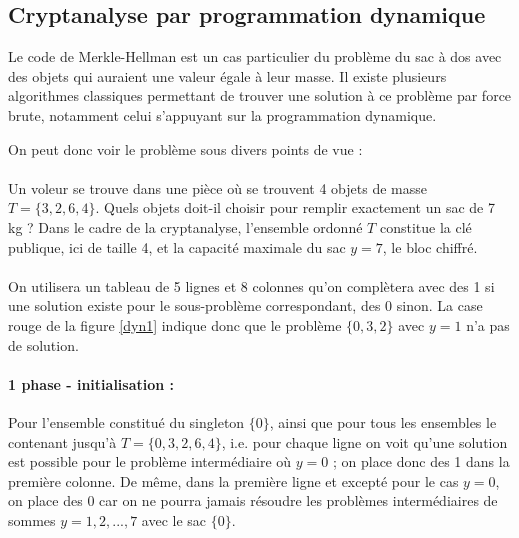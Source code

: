 \subsection{Cryptanalyse par programmation dynamique}
\label{dyn}

Le code de Merkle-Hellman est un cas particulier du problème du sac à dos avec des objets qui auraient une valeur égale à leur masse. Il existe plusieurs algorithmes classiques permettant de trouver une solution à ce problème par force brute, notamment celui s'appuyant sur la programmation dynamique.

On peut donc voir le problème sous divers points de vue : 

\paragraph{} Un voleur se trouve dans une pièce où se trouvent 4 objets de masse $T = \{3, 2, 6, 4\}$. 
Quels objets doit-il choisir pour remplir exactement un sac de 7 kg ?
Dans le cadre de la cryptanalyse, l'ensemble ordonné $T$ constitue la clé 
publique, ici de taille 4, et la capacité maximale du sac $y = 7$, le bloc chiffré.

\paragraph{} On utilisera un tableau de 5 lignes et 8 colonnes qu'on complètera avec des 1 si une solution existe pour le sous-problème correspondant, des 0 sinon. La case rouge de la figure \ref{dyn1} indique donc que le problème
$\{0,3,2\}$ avec $y = 1$ n'a pas de solution.

\paragraph{1\iere{} phase - initialisation :} Pour l'ensemble constitué du singleton $\{0\}$, 
ainsi que pour tous les ensembles le contenant jusqu'à $T = \{0, 3, 2, 6, 4\}$, i.e. pour chaque ligne
on voit qu'une solution est possible pour le problème intermédiaire où $y = 0$ ;
on place donc des 1 dans la première colonne. De même, dans la première ligne et excepté pour le cas $y = 0$, on place des 0 car on ne pourra jamais résoudre les problèmes intermédiaires de sommes $y = 1, 2, ..., 7$ avec le sac $\{0\}$.


